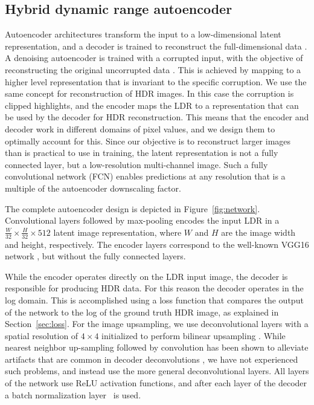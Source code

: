\documentclass[acmtog]{acmart}
\newcommand{\figref}[1]{Figure~\ref{fig:#1}}
\newcommand{\secref}[1]{Section~\ref{sec:#1}}
\begin{document}
\subsection{Hybrid dynamic range autoencoder}\label{sec:network}
Autoencoder architectures transform the input to a low-dimensional latent representation, and a decoder is trained to reconstruct the full-dimensional data \cite{hinton2006reducing}. A denoising autoencoder is trained with a corrupted input, with the objective of reconstructing the original uncorrupted data \cite{Vincent2008}. This is achieved by mapping to a higher level representation that is invariant to the specific corruption. We use the same concept for reconstruction of HDR images. In this case the corruption is clipped highlights, and the encoder maps the LDR to a representation that can be used by the decoder for HDR reconstruction. This means that the encoder and decoder work in different domains of pixel values, and we design them to optimally account for this. Since our objective is to reconstruct larger images than is practical to use in training, the latent representation is not a fully connected layer, but a low-resolution multi-channel image. Such a fully convolutional network (FCN) enables predictions at any resolution that is a multiple of the autoencoder downscaling factor.

The complete autoencoder design is depicted in \figref{network}. Convolutional layers followed by max-pooling encodes the input LDR in a $\frac{W}{32} \times \frac{H}{32} \times 512$ latent image representation, where $W$ and $H$ are the image width and height, respectively. The encoder layers correspond to the well-known VGG16 network \cite{Simonyan2014}, but without the fully connected layers.

While the encoder operates directly on the LDR input image, the decoder is responsible for producing HDR data.
For this reason the decoder operates in the log domain. This is accomplished using a loss function that compares the output of the network to the log of the ground truth HDR image, as explained in \secref{loss}. For the image upsampling, we use deconvolutional layers with a spatial resolution of $4\times4$ initialized to perform  bilinear upsampling \cite{Long2015}. While nearest neighbor up-sampling followed by convolution has been shown to alleviate artifacts that are common in decoder deconvolutions \cite{Odena2016}, we have not experienced such problems, and instead use the more general deconvolutional layers.
All layers of the network use ReLU activation functions, and after each layer of the decoder a batch normalization layer~\cite{ioffe2015batch} is used.
\end{document}
